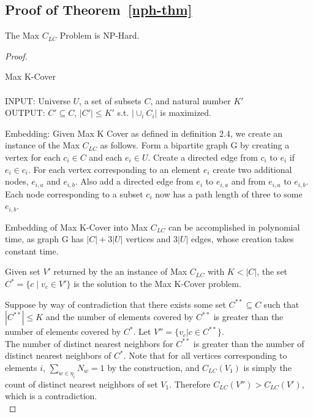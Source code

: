 \subsection{Proof of Theorem~\ref{nph-thm}}
The Max $C_{LC}$ Problem is NP-Hard. 
\begin{proof}
\begin{define} Max K-Cover ~\cite{feige98}\\ \\
INPUT: Universe $U$, a set of subsets $C$, and natural number $K'$ \\
OUTPUT: $C' \subseteq C$, $|C'| \leq K'$ s.t. $|\cup_iC_i|$ is maximized. \\
\end{define}

Embedding: Given Max K Cover as defined in definition 2.4, we create an instance of the Max $C_{LC}$ as follows.  Form a bipartite graph G by creating a vertex for each $c_i \in C$ and each $e_i \in U$. Create a directed edge from $c_i$ to $e_i$ if $e_i \in c_i$.  For each vertex corresponding to an element $e_i$ create two additional nodes, $e_{i,a}$ and $e_{i,b}$.  Also add a directed edge from $e_i$ to $e_{i,a}$ and from $e_{i,a}$ to $e_{i,b}$.  Each node corresponding to a subset $c_i$ now has a path length of three to some $e_{i,b}$. \\ 

\begin{Claim}  Embedding of Max K-Cover into Max $C_{LC}$ can be accomplished in polynomial time, as graph G has $|C| + 3|U|$ vertices and $3|U|$ edges, whose creation takes constant time.  \end{Claim}

\begin{Claim}  Given set $V'$ returned by the an instance of Max $C_{LC}$ with $K < |C|$, the set $C^* = \{ c \; | \; v_c \in V'\}$ is the solution to the Max K-Cover problem. \end{Claim}

Suppose by way of contradiction that there exists some set $C^{**} \subseteq C$ such that $|C^{**}| \leq K$ and the number of elements covered by $C^{**}$ is greater than the number of elements covered by $C^*$.  Let $V'' = \{v_c | c \in C^{**}\}$. \\ 

The number of distinct nearest neighbors for $C^{**}$ is greater than the number of distinct nearest neighbors of $C^*$.  Note that for all vertices corresponding to elements $i$, $\sum_{w \in \eta_i} N_w = 1$ by the construction, and $C_{LC}(V_1)$ is simply the count of distinct nearest neighbors of set $V_1$.  Therefore $C_{LC}(V'') > C_{LC}(V')$, which is a contradiction.  \\ 


\end{proof}
